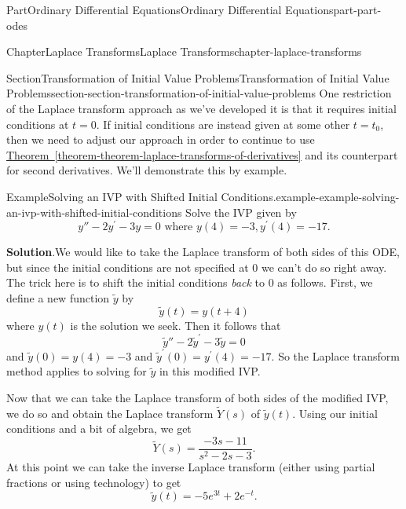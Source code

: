 \documentclass[twoside,10pt,]{book}
\newcommand{\blocktitlefont}{\relax}
\newcommand{\xreffont}{\relax}
\numberwithin{equation}{part}
\begin{document}
\begin{partptx}{Part}{Ordinary Differential Equations}{}{Ordinary Differential Equations}{}{}{part-part-odes}
\begin{chapterptx}{Chapter}{Laplace Transforms}{}{Laplace Transforms}{}{}{chapter-laplace-transforms}
\begin{sectionptx}{Section}{Transformation of Initial Value Problems}{}{Transformation of Initial Value Problems}{}{}{section-section-transformation-of-initial-value-problems}
One restriction of the Laplace transform approach as we've developed it is that it requires initial conditions at \(t=0\). If initial conditions are instead given at some other \(t=t_0\), then we need to adjust our approach in order to continue to use \hyperref[theorem-theorem-laplace-transforms-of-derivatives]{Theorem~{\xreffont\ref{theorem-theorem-laplace-transforms-of-derivatives}}} and its counterpart for second derivatives. We'll demonstrate this by example.%
\begin{example}{Example}{Solving an IVP with Shifted Initial Conditions.}{example-example-solving-an-ivp-with-shifted-initial-conditions}%
Solve the IVP given by%
\begin{equation*}
y'' - 2y^\prime - 3y = 0\text{ where }y(4) = -3, y^\prime(4) = -17.
\end{equation*}
%
\par\smallskip%
\noindent\textbf{\blocktitlefont Solution}.\hypertarget{solution-example-solving-an-ivp-with-shifted-initial-conditions-c}{}\quad{}We would like to take the Laplace transform of both sides of this ODE, but since the initial conditions are not specified at \(0\) we can't do so right away. The trick here is to shift the initial conditions \emph{back} to \(0\) as follows. First, we define a new function \(\widetilde{y}\) by%
\begin{equation*}
\widetilde{y}(t) = y(t+4)
\end{equation*}
where \(y(t)\) is the solution we seek. Then it follows that%
\begin{equation*}
\widetilde{y}'' - 2\widetilde{y}^\prime - 3\widetilde{y} = 0
\end{equation*}
and \(\widetilde{y}(0) = y(4) = -3\) and \(\widetilde{y}^\prime(0) = y^\prime(4) = -17\). So the Laplace transform method applies to solving for \(\widetilde{y}\) in this modified IVP.%
\par
Now that we can take the Laplace transform of both sides of the modified IVP, we do so and obtain the Laplace transform \(\widetilde{Y}(s)\) of \(\widetilde{y}(t)\). Using our initial conditions and a bit of algebra, we get%
\begin{equation*}
\widetilde{Y}(s) = \frac{-3s-11}{s^2-2s-3}.
\end{equation*}
At this point we can take the inverse Laplace transform (either using partial fractions or using technology) to get%
\begin{equation*}
\widetilde{y}(t) = -5e^{3t} + 2e^{-t}.
\end{equation*}
%

\end{example}
\end{sectionptx}
\end{chapterptx}
\end{partptx}
\end{document}
